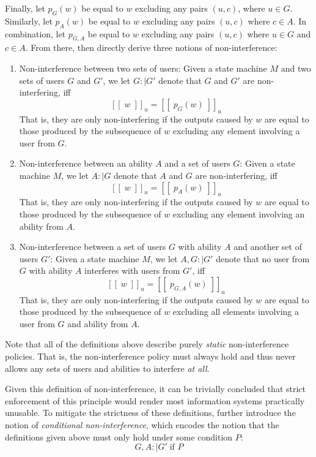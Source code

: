 Finally, let \(p_G(w)\) be equal to \(w\) excluding any pairs \((u,c)\), where \(u \in G\). Similarly, let \(p_A(w)\) be equal to \(w\) excluding any pairs \((u,c)\) where \(c \in A\). In combination, let \(p_{G,A}\) be equal to \(w\) excluding any pairs \((u,c)\) where \(u \in G\) and \(c \in A\).
From there, \citeauthor{Goguen_Meseguer_82} then directly derive three notions of non-interference:
\begin{enumerate}
    \item Non-interference between two sets of users: Given a state machine \(M\) and two sets of users \(G\) and \(G'\), we let \(G :\mid G'\) denote that \(G\) and \(G'\) are non-interfering, iff \[ 
        [[\;w\;]]_u = [[\;p_G(w)\;]]_u  
    \]
    That is, they are only non-interfering if the outputs caused by \(w\) are equal to those produced by the subsequence of \(w\) excluding any element involving a user from \(G\).
    \item Non-interference between an ability \(A\) and a set of users \(G\): Given a state machine \(M\), we let \(A :\mid G\) denote that \(A\) and \(G\) are non-interfering, iff \[
        [[\;w\;]]_u = [[\;p_A(w)\;]]_u  
    \]
    That is, they are only non-interfering if the outputs caused by \(w\) are equal to those produced by the subsequence of \(w\) excluding any element involving an ability from \(A\).
    \item Non-interference between a set of users \(G\) with ability \(A\) and another set of users \(G'\): Given a state machine \(M\), we let \(A,G :\mid G'\) denote that no user from \(G\) with ability \(A\) interferes with users from \(G'\), iff \[
        [[\;w\;]]_u = [[\;p_{G,A}(w)\;]]_u   
    \]
    That is, they are only non-interfering if the outputs caused by \(w\) are equal to those produced by the subsequence of \(w\) excluding all elements involving a user from \(G\) and ability from \(A\).
\end{enumerate}



Note that all of the definitions above describe purely \emph{static} non-interference policies. That is, the non-interference policy must always hold and thus never allows any sets of users and abilities to interfere \emph{at all}. 

Given this definition of non-interference, it can be trivially concluded that strict enforcement of this principle would render most information systems practically unusable.
To mitigate the strictness of these definitions, \citeauthor{Goguen_Meseguer_82} further introduce the notion of \emph{conditional non-interference}, which encodes the notion that the definitions given above must only hold under some condition \(P\): \[
     G,A :\mid G' \; \text{if } P 
\]

